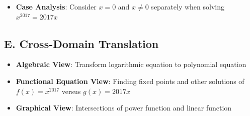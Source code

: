 \documentclass[]{article}
\begin{document}
\begin{strategicbox}
\begin{itemize}[leftmargin=*]
    \item \textbf{Case Analysis}: Consider $x=0$ and $x \neq 0$ separately when solving $x^{2017} = 2017x$
\end{itemize}

\subsection*{E. Cross-Domain Translation}
\begin{itemize}[leftmargin=*]
    \item \textbf{Algebraic View}: Transform logarithmic equation to polynomial equation
    
    \item \textbf{Functional Equation View}: Finding fixed points and other solutions of $f(x) = x^{2017}$ versus $g(x) = 2017x$
    
    \item \textbf{Graphical View}: Intersections of power function and linear function
\end{itemize}
\end{strategicbox}
\end{document}
